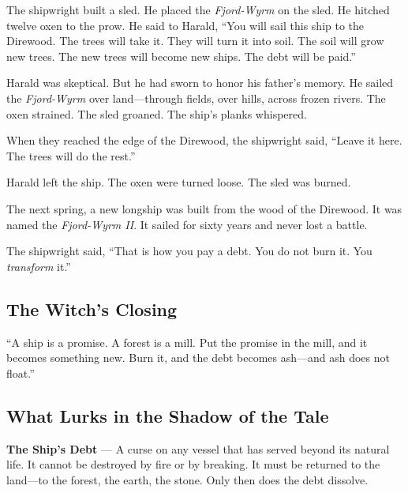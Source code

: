 \documentclass[9pt,a5paper]{extbook}
\begin{document}
The shipwright built a sled. He placed the \textit{Fjord-Wyrm} on the sled. He hitched twelve oxen to the prow. He said to Harald, ``You will sail this ship to the Direwood. The trees will take it. They will turn it into soil. The soil will grow new trees. The new trees will become new ships. The debt will be paid.''

Harald was skeptical. But he had sworn to honor his father's memory. He sailed the \textit{Fjord-Wyrm} over land---through fields, over hills, across frozen rivers. The oxen strained. The sled groaned. The ship's planks whispered.

When they reached the edge of the Direwood, the shipwright said, ``Leave it here. The trees will do the rest.''

Harald left the ship. The oxen were turned loose. The sled was burned.

The next spring, a new longship was built from the wood of the Direwood. It was named the \textit{Fjord-Wyrm II}. It sailed for sixty years and never lost a battle.

The shipwright said, ``That is how you pay a debt. You do not burn it. You \textit{transform} it.''

\subsection*{The Witch's Closing}

``A ship is a promise. A forest is a mill. Put the promise in the mill, and it becomes something new. Burn it, and the debt becomes ash---and ash does not float.''

\subsection*{What Lurks in the Shadow of the Tale}

\textbf{The Ship's Debt} --- A curse on any vessel that has served beyond its natural life. It cannot be destroyed by fire or by breaking. It must be returned to the land---to the forest, the earth, the stone. Only then does the debt dissolve.
\end{document}
